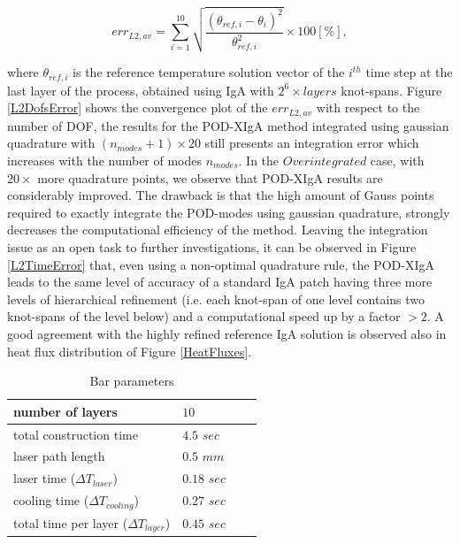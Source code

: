 \documentclass[3p]{article}
\begin{document}
\begin{equation}
err_{L2,av} = \sum_{i=1}^{10}\sqrt{\dfrac{(\theta_{ref,i}-\theta_{i})^{2}}{\theta_{ref,i}^2}}\times 100\left[\%\right],
\end{equation}

where $\theta_{ref,i}$ is the reference temperature solution vector of the $i^{th}$ time step at the last layer of the process, obtained using IgA with $2^6\times layers$ knot-spans.
Figure \ref{L2DofsError} shows the convergence plot of the $err_{L2,av}$ with respect to the number of DOF, the results for the POD-XIgA method integrated using gaussian quadrature with $(n_{modes}+1)\times20$ still presents an integration error which increases with the number of modes $n_{modes}$. In the $Overintegrated$ case, with $20\times$ more quadrature points, we observe that POD-XIgA results are considerably improved. The drawback is that the high amount of Gauss points required to exactly integrate the POD-modes using gaussian quadrature, strongly decreases the computational  efficiency of the method. Leaving the integration issue as an open task to further investigations, it can be observed in Figure \ref{L2TimeError} that, even using a non-optimal quadrature rule, the POD-XIgA leads to the same level of accuracy of a standard IgA patch having three more levels of hierarchical refinement (i.e. each knot-span of one level contains two knot-spans of the level below) and a computational speed up by a factor $>2$.
A good agreement with the highly refined reference IgA solution is observed also in heat flux distribution of Figure \ref{HeatFluxes}. 

\begin{table}[!h]
\centering
    \begin{tabular}{ | l | l | l | p{5cm} |}
    \hline
    number of layers & $10$\\ \hline
    total construction time & $4.5$ $sec$\\ \hline
    laser path length & $0.5$ $mm$\\  \hline
    laser time ($\Delta T_{laser}$) & $0.18$ $sec$\\  \hline
    cooling time ($\Delta T_{cooling}$) & $0.27$ $sec$\\  \hline
    total time per layer ($\Delta T_{layer}$) & $0.45$ $sec$\\  
    \hline
    \end{tabular}
\caption{Bar parameters}
\label{table::processParameters}
\end{table}
\end{document}
